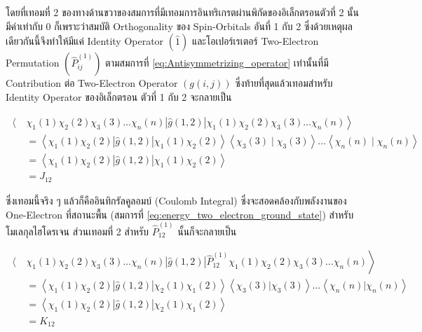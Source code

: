 \noindent โดยที่เทอมที่ 2 ของทางด้านขวาของสมการที่มีเทอมการอินทริเกรตผ่านพิกัดของอิเล็กตรอนตัวที่ 2 นั้นมีค่าเท่ากับ 0 ก็เพราะว่าสมบัติ
Orthogonality ของ Spin-Orbitals อันที่ 1 กับ 2 ซึ่งด้วยเหตุผลเดียวกันนี้จึงทำให้มีแค่ Identity Operator $(\hat{1})$
และโอเปอร์เรเตอร์ Two-Electron Permutation $(\hat{P}_{i j}^{(1)})$ ตามสมการที่ \eqref{eq:Antisymmetrizing_operator}
เท่านั้นที่มี Contribution ต่อ Two-Electron Operator $(g(i, j))$ ซึ่งท้ายที่สุดแล้วเทอมสำหรับ Identity Operator ของอิเล็กตรอน%
ตัวที่ 1 กับ 2 จะกลายเป็น

\begin{equation}
  \label{eq:J12_Coulomb_integral}
  \begin{aligned}
    \left\langle \right. & \chi_1(1) \chi_2(2) \chi_3(3) \dots \chi_n(n)|\hat{g}(1,2)|
    \chi_1(1) \chi_2(2) \chi_3(3) \dots \chi_n(n) \left. \right\rangle                                                           \\
                         & = \left\langle\chi_1(1) \chi_2(2)|\hat{g}(1,2)| \chi_1(1) \chi_2(2)\right\rangle\left\langle\chi_3(3)
    \mid \chi_3(3)\right\rangle \dots\left\langle\chi_n(n) \mid \chi_n(n)\right\rangle                                           \\
                         & = \left\langle\chi_1(1) \chi_2(2)|\hat{g}(1,2)| \chi_1(1) \chi_2(2)\right\rangle                      \\
                         & = J_{12}
  \end{aligned}
\end{equation}

\noindent ซึ่งเทอมนี้จริง ๆ แล้วก็คืออินทิกรัลคูลอมบ์ (Coulomb Integral) ซึ่งจะสอดคล้องกับพลังงานของ One-Electron ที่สถานะพื้น
(สมการที่ \eqref{eq:energy_two_electron_ground_state}) สำหรับโมเลกุลไฮโดรเจน ส่วนเทอมที่ 2 สำหรับ
$\hat{P}_{12}^{(1)}$ นั้นก็จะกลายเป็น

\begin{equation}
  \label{eq:K12_exchange_integral}
  \begin{aligned}
    \left\langle \right. & \chi_1(1) \chi_2(2) \chi_3(3) \dots \chi_n(n)
    |\hat{g}(1,2)|
    \hat{P}_{12}^{(1)} \chi_1(1) \chi_2(2) \chi_3(3) \dots \chi_n(n) \left. \right\rangle          \\
                         & = \left\langle\chi_1(1) \chi_2(2)
    |\hat{g}(1,2)|
    \chi_2(1) \chi_1(2)\right\rangle
    \left\langle\chi_3(3)|\chi_3(3)\right\rangle \dots\left\langle\chi_n(n)|\chi_n(n)\right\rangle \\
                         & = \left\langle\chi_1(1) \chi_2(2)
    |\hat{g}(1,2)|
    \chi_2(1) \chi_1(2)\right\rangle                                                               \\
                         & = K_{12}
  \end{aligned}
\end{equation}

